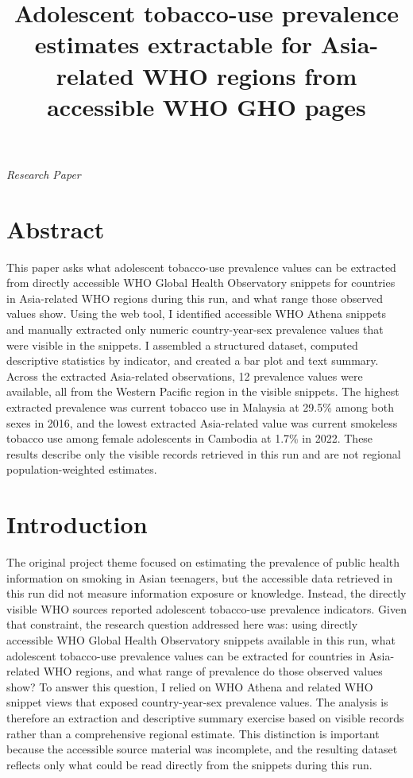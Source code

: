 \documentclass[11pt]{article}
\title{Adolescent tobacco-use prevalence estimates extractable for Asia-related WHO regions from accessible WHO GHO pages}
\author{}
\date{}
\begin{document}
\maketitle

\begin{center}\textit{Research Paper}\end{center}

\section*{Abstract}
This paper asks what adolescent tobacco-use prevalence values can be extracted from directly accessible WHO Global Health Observatory snippets for countries in Asia-related WHO regions during this run, and what range those observed values show. Using the web tool, I identified accessible WHO Athena snippets and manually extracted only numeric country-year-sex prevalence values that were visible in the snippets. I assembled a structured dataset, computed descriptive statistics by indicator, and created a bar plot and text summary. Across the extracted Asia-related observations, 12 prevalence values were available, all from the Western Pacific region in the visible snippets. The highest extracted prevalence was current tobacco use in Malaysia at 29.5\% among both sexes in 2016, and the lowest extracted Asia-related value was current smokeless tobacco use among female adolescents in Cambodia at 1.7\% in 2022. These results describe only the visible records retrieved in this run and are not regional population-weighted estimates.

\section{Introduction}
The original project theme focused on estimating the prevalence of public health information on smoking in Asian teenagers, but the accessible data retrieved in this run did not measure information exposure or knowledge. Instead, the directly visible WHO sources reported adolescent tobacco-use prevalence indicators. Given that constraint, the research question addressed here was: using directly accessible WHO Global Health Observatory snippets available in this run, what adolescent tobacco-use prevalence values can be extracted for countries in Asia-related WHO regions, and what range of prevalence do those observed values show? To answer this question, I relied on WHO Athena and related WHO snippet views that exposed country-year-sex prevalence values. The analysis is therefore an extraction and descriptive summary exercise based on visible records rather than a comprehensive regional estimate. This distinction is important because the accessible source material was incomplete, and the resulting dataset reflects only what could be read directly from the snippets during this run.
\end{document}
